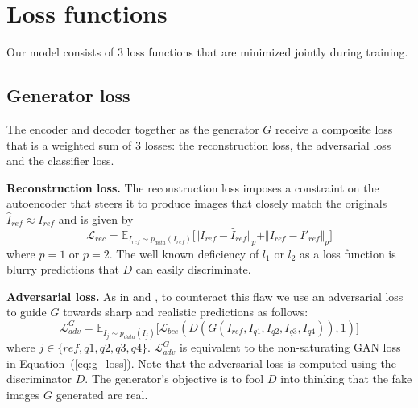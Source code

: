 \documentclass[a4paper,12pt]{report}
\begin{document}
\section{Loss functions}
Our model consists of 3 loss functions that are minimized jointly during training.

\subsection{Generator loss}
The encoder and decoder together as the generator $G$ receive a composite loss that is a weighted sum of 3 losses: the reconstruction loss, the adversarial loss and the classifier loss. 

\textbf{Reconstruction loss.} The reconstruction loss imposes a constraint on the autoencoder that steers it to produce images that closely match the originals $\hat{I}_{ref} \approx I_{ref}$ and is given by
\begin{equation} \label{eq:4}
    \mathcal{L}_{rec} = \mathbb{E}_{I_{ref}\sim p_{data} (I_{ref})}\big[ \Vert I_{ref} - \hat{I}_{ref} \Vert_p + \Vert I_{ref} - I'_{ref} \Vert_p \big]
\end{equation}
where $p = 1$ or $p = 2$. The well known deficiency of $l_1$ or $l_2$ as a loss function is blurry predictions that $D$ can easily discriminate.

\textbf{Adversarial loss.} As in \cite{DisentFacOfVarByMixTh} and \cite{1511.05440}, to counteract this flaw we use an adversarial loss to guide $G$ towards sharp and realistic predictions as follows:
\begin{equation} \label{eq:5}
    \mathcal{L}^G_{adv} = \mathbb{E}_{I_{j}\sim p_{data} (I_{j})}\big[ \mathcal{L}_{bce}(D(G(I_{ref},I_{q1},I_{q2},I_{q3},I_{q4})), 1)\big]
\end{equation}
where $j \in \{ref,q1,q2,q3,q4\}$. $\mathcal{L}^G_{adv}$ is equivalent to the non-saturating GAN loss in Equation~(\ref{eq:g_loss}). Note that the adversarial loss is computed using the discriminator $D$. The generator's objective is to fool $D$ into thinking that the fake images $G$ generated are real.
\end{document}
